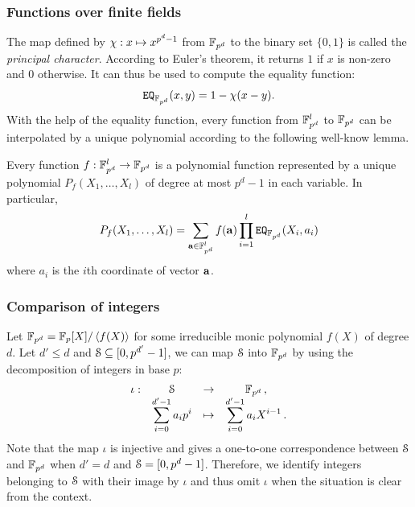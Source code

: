 \subsubsection{Functions over finite fields}\label{subsec:funcff}
The map defined by $\princhar: x \mapsto x^{p^d-1}$ from $\F_{p^d}$ to the binary set $\{0,1\}$ is called the \emph{principal character}. 
According to Euler's theorem, it returns $1$ if $x$ is non-zero and $0$ otherwise. 
It can thus be used to compute the equality function:
\begin{align*}
  \EQ_{\F_{p^d}}(x,y) = 1 - \princhar (x-y).
\end{align*}
With the help of the equality function, every function from $\F_{p^d}^l$ to $\F_{p^d}$ can be interpolated by a unique polynomial according to the following well-know lemma. 
\begin{lemma}\label{lem:interpolation}
  Every function $f: \F_{p^d}^l \rightarrow \F_{p^d}$ is a polynomial function represented by a unique polynomial $P_f(X_1,\dots,X_{l})$ of degree at most $p^d - 1$ in each variable.
  In particular,
  \begin{align*}
    P_f(X_1,\dots,X_{l}) = \sum_{\va \in \F^l_{p^d}} f(\va) \prod_{i=1}^{l} \EQ_{\F_{p^d}}(X_i,a_i) %
  \end{align*}
  where $a_i$ is the $i$th coordinate of vector $\va$. 
\end{lemma}

\subsubsection{Comparison of integers}
  Let $\F_{p^d} = \F_p[X]/\ideal{f(X)}$ for some irreducible monic polynomial $f(X)$ of degree $d$.
  Let $d'\leq d$ and $\S \subseteq [0,p^{d'}-1]$, we can map $\S$ into $\F_{p^d}$ by using the decomposition of integers in base $p$:
  $$\begin{array}{cccc}
      \iota : & \S & \rightarrow & \F_{p^d}\,, \\
              & \displaystyle\sum_{i=0}^{d'-1}a_ip^i & \mapsto & \displaystyle\sum_{i=0}^{d'-1}a_i X^{i-1}\,. 
    \end{array}$$
  Note that the map $\iota$ is injective and gives a one-to-one correspondence between $\S$ and $\F_{p^{d}}$ when $d'=d$ and $\S = [0,p^d-1]$. 
  Therefore, we identify integers belonging to $\S$ with their image by $\iota$ and thus omit $\iota$ when the situation is clear from the context.

